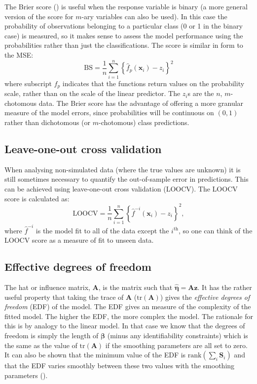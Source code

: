 The Brier score (\cite{brier50}) is useful when the response variable is binary (a more general version of the score for $m$-ary variables can also be used). In this case the probability of observations belonging to a particular class (0 or 1 in the binary case) is measured, so it makes sense to assess the model performance using the probabilities rather than just the classifications. The score is similar in form to the MSE:
\begin{equation}
\text{BS} = \frac{1}{n} \sum_{i=1}^{n} \left \{\hat{f}_p(\mathbf{x}_i)-z_i \right \}^2
\end{equation}
where subscript $f_p$ indicates that the functions return values on the probability scale, rather than on the  scale of the linear predictor. The $z_i$s are the $n$, $m$-chotomous data. The Brier score has the advantage of offering a more granular measure of the model errors, since probabilities will be continuous on $(0,1)$ rather than dichotomous (or $m$-chotomous) class predictions.

\subsection{Leave-one-out cross validation}
\label{DEFN-LOOCV}

When analysing non-simulated data (where the true values are unknown) it is still sometimes necessary to quantify the out-of-sample error in predictions. This can be achieved using leave-one-out cross validation (LOOCV). The LOOCV score is calculated as:
\begin{equation}
\text{LOOCV} = \frac{1}{n} \sum_{i=1}^n \left \{ \hat{f}^{-i}(\mathbf{x}_i) - z_i \right\}^2,
\end{equation}
where $\hat{f}^{-i}$ is the model fit to all of the data except the $i^\text{th}$, so one can think of the LOOCV score as a measure of fit to unseen data.

\subsection{Effective degrees of freedom}
\label{GAMEDF}

The hat or influence matrix, $\mathbf{A}$, is the matrix such that $\hat{\bm{\eta}} = \mathbf{A}\mathbf{z}$. It has the rather useful property that taking the trace of $\mathbf{A}$ ($\text{tr}(\mathbf{A})$) gives the \textit{effective degrees of freedom} (EDF) of the model. The EDF gives an measure of the complexity of the fitted model. The higher the EDF, the more complex the model. The rationale for this is by analogy to the linear model. In that case we know that the degrees of freedom is simply the length of $\bm{\beta}$ (minus any identifiability constraints) which is the same as the value of $\text{tr}(\mathbf{A})$ if the smoothing parameters are all set to zero. It can also be shown that the minimum value of the EDF is $\text{rank}(\sum_i \mathbf{S}_i)$ and that the EDF varies smoothly between these two values with the smoothing parameters (\cite[p. 170--171]{simonbook}).

